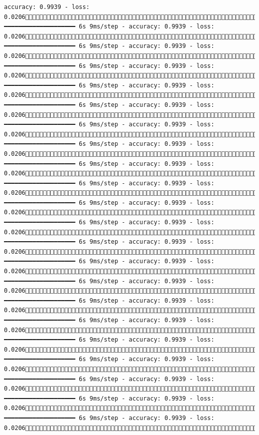 \documentclass[
  letterpaper,
  DIV=11,
  numbers=noendperiod]{scrreprt}
\begin{document}
\begin{verbatim}
accuracy: 0.9939 - loss: 0.02061092/1875 ━━━━━━━━━━━━━━━━━━━━ 6s 9ms/step - accuracy: 0.9939 - loss: 0.02061098/1875 ━━━━━━━━━━━━━━━━━━━━ 6s 9ms/step - accuracy: 0.9939 - loss: 0.02061104/1875 ━━━━━━━━━━━━━━━━━━━━ 6s 9ms/step - accuracy: 0.9939 - loss: 0.02061110/1875 ━━━━━━━━━━━━━━━━━━━━ 6s 9ms/step - accuracy: 0.9939 - loss: 0.02061116/1875 ━━━━━━━━━━━━━━━━━━━━ 6s 9ms/step - accuracy: 0.9939 - loss: 0.02061122/1875 ━━━━━━━━━━━━━━━━━━━━ 6s 9ms/step - accuracy: 0.9939 - loss: 0.02061128/1875 ━━━━━━━━━━━━━━━━━━━━ 6s 9ms/step - accuracy: 0.9939 - loss: 0.02061134/1875 ━━━━━━━━━━━━━━━━━━━━ 6s 9ms/step - accuracy: 0.9939 - loss: 0.02061139/1875 ━━━━━━━━━━━━━━━━━━━━ 6s 9ms/step - accuracy: 0.9939 - loss: 0.02061144/1875 ━━━━━━━━━━━━━━━━━━━━ 6s 9ms/step - accuracy: 0.9939 - loss: 0.02061151/1875 ━━━━━━━━━━━━━━━━━━━━ 6s 9ms/step - accuracy: 0.9939 - loss: 0.02061155/1875 ━━━━━━━━━━━━━━━━━━━━ 6s 9ms/step - accuracy: 0.9939 - loss: 0.02061158/1875 ━━━━━━━━━━━━━━━━━━━━ 6s 9ms/step - accuracy: 0.9939 - loss: 0.02061161/1875 ━━━━━━━━━━━━━━━━━━━━ 6s 9ms/step - accuracy: 0.9939 - loss: 0.02061165/1875 ━━━━━━━━━━━━━━━━━━━━ 6s 9ms/step - accuracy: 0.9939 - loss: 0.02061170/1875 ━━━━━━━━━━━━━━━━━━━━ 6s 9ms/step - accuracy: 0.9939 - loss: 0.02061175/1875 ━━━━━━━━━━━━━━━━━━━━ 6s 9ms/step - accuracy: 0.9939 - loss: 0.02061179/1875 ━━━━━━━━━━━━━━━━━━━━ 6s 9ms/step - accuracy: 0.9939 - loss: 0.02061184/1875 ━━━━━━━━━━━━━━━━━━━━ 6s 9ms/step - accuracy: 0.9939 - loss: 0.02061189/1875 ━━━━━━━━━━━━━━━━━━━━ 6s 9ms/step - accuracy: 0.9939 - loss: 0.02061195/1875 ━━━━━━━━━━━━━━━━━━━━ 6s 9ms/step - accuracy: 0.9939 - loss: 0.02061199/1875 
\end{verbatim}
\end{document}
